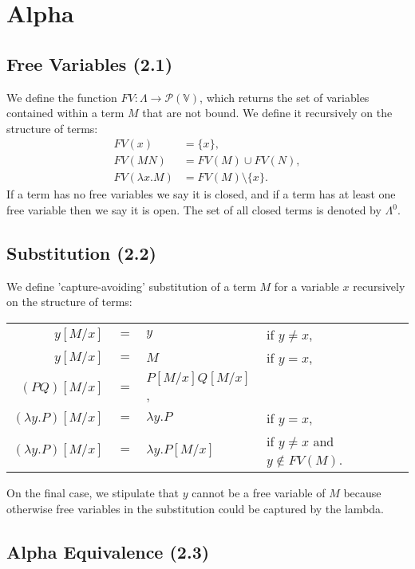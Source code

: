\section{Alpha}

\subsection{Free Variables (2.1)}

We define the function $FV : \Lambda \to \mathcal{P}(\mathbb{V})$,
which returns the set of variables contained within a term $M$ that
are not bound. We define it recursively on the structure of terms: 
\begin{align*}
    FV(x) &= \{x\}, \\
    FV(MN) &= FV(M) \cup FV(N), \\
    FV(\lambda x.M) &= FV(M) \setminus \{x\}.
\end{align*} If a term has no free variables we say it is closed,
and if a term has at least one free variable then we say it is open.
The set of all closed terms is denoted by $\Lambda^0$.

\subsection{Substitution (2.2)}

We define 'capture-avoiding' substitution of a term $M$ for a variable $x$
recursively on the structure of terms: \begin{center}
    \begin{tabular}{ r c l l }
        $y[M/x]$             & $=$ & $y$                        & if $y \neq x$, \\
        $y[M/x]$             & $=$ & $M$                        & if $y = x$, \\
        $(PQ)[M/x]$          & $=$ & $P[M/x] Q[M/x]$, & \\
        $(\lambda y.P)[M/x]$ & $=$ & $\lambda y.P$              & if $y = x$, \\
        $(\lambda y.P)[M/x]$ & $=$ & $\lambda y.P[M/x]$         & if $y \neq x$ and $y \notin FV(M)$.
    \end{tabular} 
\end{center} On the final case, we stipulate that $y$ cannot be a free variable of
$M$ because otherwise free variables in the substitution could be captured by
the lambda.

\subsection{Alpha Equivalence (2.3)}

